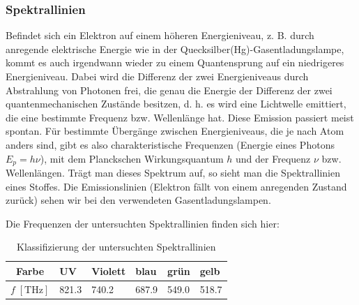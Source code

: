 \subsubsection{Spektrallinien}
Befindet sich ein Elektron auf einem höheren Energieniveau, z. B. durch anregende elektrische Energie wie in der Quecksilber(Hg)-Gasentladungslampe, kommt es auch irgendwann wieder zu einem Quantensprung auf ein niedrigeres Energieniveau. Dabei wird die Differenz der zwei Energieniveaus durch Abstrahlung von Photonen frei, die genau die Energie der Differenz der zwei quantenmechanischen Zustände besitzen, d. h. es wird eine Lichtwelle emittiert, die eine bestimmte Frequenz bzw. Wellenlänge hat. Diese Emission passiert meist spontan. Für bestimmte Übergänge zwischen Energieniveaus, die je nach Atom anders sind, gibt es also charakteristische Frequenzen (Energie eines Photons \(E_p=h\nu\)), mit dem Planckschen Wirkungsquantum \(h\) und der Frequenz \(\nu\) bzw. Wellenlängen. Trägt man dieses Spektrum auf, so sieht man die Spektrallinien eines Stoffes. Die Emissionslinien (Elektron fällt von einem anregenden Zustand zurück) sehen wir bei den verwendeten Gasentladungslampen.

Die Frequenzen der untersuchten Spektrallinien finden sich hier:
\begin{table}[htbp]
  \centering
  \caption{Klassifizierung der untersuchten Spektrallinien \autocite{Skript_1}}
\begin{tabularx}{0.8\textwidth}{cTTTTT}
\toprule
Farbe  & UV    & Violett & blau  & grün  & gelb  \\ \midrule
\(f\;[\unit{\tera\hertz}]\) & 821.3 & 740.2    & 687.9 & 549.0 & 518.7\\
\bottomrule
\end{tabularx}
\label{table:frequenzen}
\end{table}
